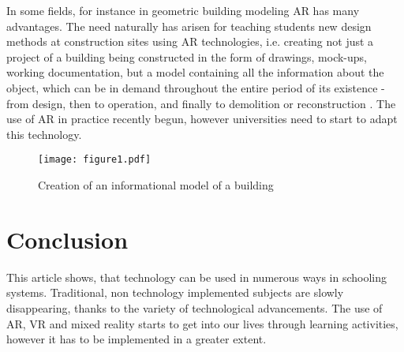 \documentclass[10pt,oneside,english,a4paper]{article}
\begin{document}
	 In some fields, for instance in geometric building modeling AR has many advantages. The need naturally has arisen for teaching students new design methods at construction sites using AR technologies, i.e. creating not just a project of a building being constructed in the form of drawings, mock-ups, working documentation, but a model containing all the information about the object, which can be in demand throughout the entire period of its existence - from design, then to operation, and finally to demolition or reconstruction \cite{Tretyakova2019}. The use of AR in practice recently begun, however universities need to start to adapt this technology. 



\begin{figure*}[tbh]
\centering
\texttt{[image: figure1.pdf]}
\caption{Creation of an informational model of a building\cite{Tretyakova2019}}
\label{f:rozhod}
\end{figure*}

\section{Conclusion}

	This article shows, that technology can be used in numerous ways in schooling systems. Traditional, non technology implemented subjects are slowly disappearing, thanks to the variety of technological advancements. The use of AR, VR and mixed reality starts to get into our lives through learning activities, however it has to be implemented in a greater extent.






\end{document}
